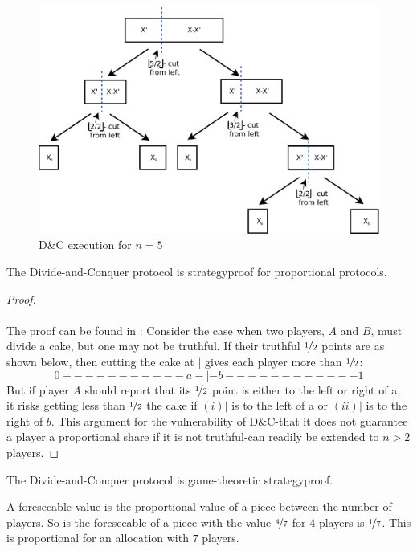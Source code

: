 \begin{figure}[h!]
		\centering
 		 \includegraphics[width=380pt]{bilder/dcbsp.pdf}
   \caption{D$\&$C execution for $n=5$}
  	 \end{figure}
\begin{lem}
\label{dc1}
The Divide-and-Conquer protocol is strategyproof for proportional protocols.
\end{lem}
\begin{proof} 
\textcolor{white}{x}\\\\
The proof can be found in \cite{dc}: Consider the case when two players, $A$ and $B$, must divide a 
cake, but one may not be truthful.  If their truthful $\nicefrac{1}{2}$ points are as shown below, then 
cutting the cake at $|$ gives each player more than $\nicefrac{1}{2}$: 
$$0-----------a-|-b------------1$$ 
But if player $A$ should report that its $\nicefrac{1}{2}$ point is either to the left or right of a, it risks 
getting less than $\nicefrac{1}{2}$ the cake if $(i) |$ is to the left of a or $(ii) |$ is to the right of $b$.  This argument for the vulnerability of D$\&$C-that it does not guarantee a player a proportional 
share if it is not truthful-can readily be extended to $n > 2$ players.
\end{proof}
\begin{lem}
\label{dc2}
The Divide-and-Conquer protocol is game-theoretic strategyproof.
\end{lem}
A foreseeable value is the proportional value of a piece between the number of players. So is the foreseeable of a piece with the value $\nicefrac{4}{7}$ for $4$ players is $\nicefrac{1}{7}$. This is proportional for an allocation with $7$ players.
